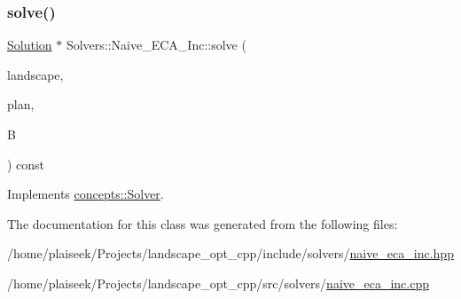 \subsubsection{\texorpdfstring{solve()}{solve()}}
{\footnotesize\ttfamily \hyperlink{class_solution}{Solution} $\ast$ Solvers\+::\+Naive\+\_\+\+E\+C\+A\+\_\+\+Inc\+::solve (\begin{DoxyParamCaption}\item[{const \hyperlink{class_landscape}{Landscape} \&}]{landscape,  }\item[{const \hyperlink{class_restoration_plan}{Restoration\+Plan} \&}]{plan,  }\item[{const double}]{B }\end{DoxyParamCaption}) const\hspace{0.3cm}{\ttfamily [virtual]}}



Implements \hyperlink{classconcepts_1_1_solver_af323ad29df1e7b87facd7dc007568c80}{concepts\+::\+Solver}.



The documentation for this class was generated from the following files\+:\begin{DoxyCompactItemize}
\item 
/home/plaiseek/\+Projects/landscape\+\_\+opt\+\_\+cpp/include/solvers/\hyperlink{naive__eca__inc_8hpp}{naive\+\_\+eca\+\_\+inc.\+hpp}\item 
/home/plaiseek/\+Projects/landscape\+\_\+opt\+\_\+cpp/src/solvers/\hyperlink{naive__eca__inc_8cpp}{naive\+\_\+eca\+\_\+inc.\+cpp}\end{DoxyCompactItemize}
